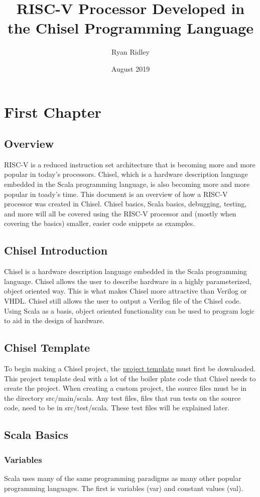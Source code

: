 \documentclass[12pt, letterpaper]{report}
\title{RISC-V Processor Developed in the Chisel Programming Language}
\author{Ryan Ridley}
\date{August 2019}
\begin{document}
\maketitle
\chapter{First Chapter}
\section{Overview}
RISC-V is a reduced instruction set architecture that is becoming more and more popular in today's processors. Chisel, which is a hardware 
description language embedded in the Scala programming language, is also becoming more and more popular in toady's time. This document is 
an overview of how a RISC-V processor was created in Chisel. Chisel basics, Scala basics, debugging, testing, and more will all be covered 
using the RISC-V processor and (mostly when covering the basics) smaller, easier code snippets as examples. 
\section{Chisel Introduction}
Chisel is a hardware description language embedded in the Scala programming language. Chisel allows the user to describe hardware in a
highly parameterized, object oriented way. This is what makes Chisel more attractive than Verilog or VHDL. Chisel still allows the user to
output a Verilog file of the Chisel code. Using Scala as a basis, object oriented functionality can be used to program logic to aid in the design
of hardware.
\section{Chisel Template}
To begin making a Chisel project, the \href{https://github.com/freechipsproject/chisel-template}{project template} must first be downloaded. 
This project template deal with a lot of the boiler plate code that Chisel needs to create the project.
When creating a custom project, the source files must be in the directory src/main/scala. Any test files, files that run tests on the source code, 
need to be in src/test/scala. These test files will be explained later.
\section{Scala Basics}
\subsection{Variables}
Scala uses many of the same programming paradigms as many other popular programming languages. The first is  variables (var) and constant values (val). 
\end{document}
